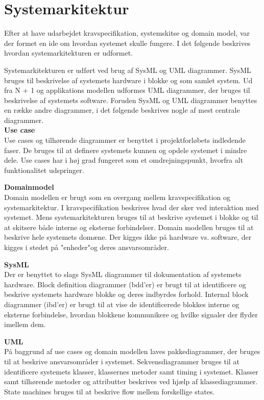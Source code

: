 \section{Systemarkitektur}
\label{chap:systemarkitektur}

Efter at have udarbejdet kravspecifikation, systemskitse og domain model, var der formet en ide om hvordan systemet skulle fungere. I det følgende beskrives hvordan systemarkitekturen er udformet. 

Systemarkitekturen er udført ved brug af SysML og UML diagrammer. 
SysML bruges til beskrivelse af systemets hardware i blokke og som samlet system. Ud fra N + 1 og applikations modellen udformes UML diagrammer, der bruges til beskrivelse af systemets software. 
Foruden SysML og UML diagrammer benyttes en række andre diagrammer, i det følgende beskrives nogle af mest centrale diagrammer.\\


\textbf{Use case}\\
Use cases og tilhørende diagrammer er benyttet i projektforløbets indledende faser. De bruges til at definere systemets kunnen og opdele systemet i mindre dele. Use cases har i høj grad fungeret som et omdrejningspunkt, hvorfra alt funktionalitet udspringer.

\textbf{Domainmodel}\\
Domain modellen er brugt som en overgang mellem kravspecifikation og systemarkitektur.
I kravspecifikation beskrives hvad der sker ved interaktion med systemet. Mens
systemarkitekturen bruges til at beskrive systemet i blokke og til at skitsere både interne
og eksterne forbindelser. Domain modellen bruges til at beskrive hele systemets domæne.
Der kigges ikke på hardware vs. software, der kigges i stedet på "enheder"og deres
ansvarsområder.

\textbf{SysML}\\
Der er benyttet to slags SysML diagrammer til dokumentation af systemets hardware. Block definition diagrammer (bdd'er) er brugt til at identificere og beskrive systemets hardware blokke og deres indbyrdes forhold. Internal block diagrammer (ibd'er) er brugt til at vise de identificerede blokkes interne og eksterne forbindelse, hvordan blokkene kommunikere og hvilke signaler der flyder imellem dem.


\textbf{UML}\\
På baggrund af use cases og domain modellen laves pakkediagrammer, der bruges til at beskrive ansvarsområder i systemet. Sekvensdiagrammer bruges til at identificere systemets klasser, klassernes metoder samt timing i systemet. Klasser samt tilhørende metoder og attributter beskrives ved hjælp af klassediagrammer. State machines bruges til at beskrive flow mellem forskellige states. 


